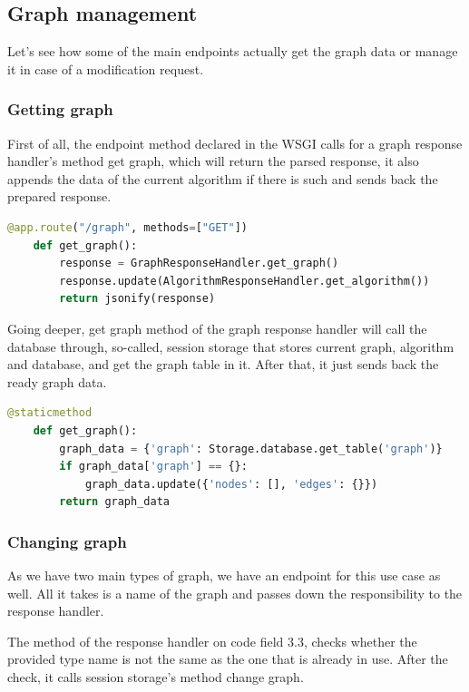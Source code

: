 \subsection{Graph management}

Let's see how some of the main endpoints actually get the graph data or manage it in case of a modification request.

\subsubsection{Getting graph}

First of all, the endpoint method declared in the WSGI calls for a graph response handler's method get graph, which will return the parsed response, it also appends the data of the current algorithm if there is such and sends back the prepared response.

\begin{lstlisting}[language={python}]
	@app.route("/graph", methods=["GET"])
	def get_graph():
		response = GraphResponseHandler.get_graph()
		response.update(AlgorithmResponseHandler.get_algorithm())
		return jsonify(response)
\end{lstlisting}

Going deeper, get graph method of the graph response handler will call the database through, so-called, session storage that stores current graph, algorithm and database, and get the graph table in it. After that, it just sends back the ready graph data.

\begin{lstlisting}[language={python}]
 	@staticmethod
	def get_graph():
		graph_data = {'graph': Storage.database.get_table('graph')}
		if graph_data['graph'] == {}:
			graph_data.update({'nodes': [], 'edges': {}})
		return graph_data
\end{lstlisting}

\subsubsection{Changing graph}

As we have two main types of graph, we have an endpoint for this use case as well. All it takes is a name of the graph and passes down the responsibility to the response handler. 

The method of the response handler on code field 3.3, checks whether the provided type name is not the same as the one that is already in use. After the check, it calls session storage's method change graph.


